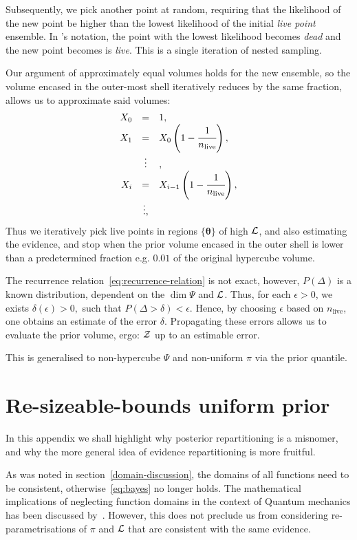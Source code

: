 \documentclass[usenatbib]{mnras}
\begin{document}
Subsequently, we pick another point at random, requiring that the
likelihood of the new point be higher than the lowest likelihood of
the initial \emph{live point} ensemble. In \citeauthor{Skilling2006}'s
notation, the point with the lowest likelihood becomes \emph{dead} and
the new point becomes is \emph{live}. This is a single iteration of
nested sampling.

Our argument of approximately equal volumes holds for the new
ensemble, so the volume encased in the outer-most shell iteratively
reduces by the same fraction, allows us to approximate said volumes:
\begin{equation}\label{eq:recurrence-relation}
  \begin{array}{rcl}
  X_{0} &=  &1, \\
  X_{1} &= &X_{0} \left(1- \cfrac{1}{n_\text{live}}\right),\\
  & \vdots &, \\
  X_{i} &= &X_{i-1}\left(1- \cfrac{1}{n_\text{live}}\right),\\
  & \vdots, &
\end{array}
\end{equation}
Thus we iteratively pick live points in regions $\{\bm{\theta}\}$ of
high \({\cal L}\), and also estimating the evidence, and stop when the
prior volume encased in the outer shell is lower than a predetermined
fraction e.g. \(0.01\) of the original hypercube volume.

The recurrence relation~\eqref{eq:recurrence-relation} is not exact,
however, \(P(\Delta)\) is a known distribution, dependent on the
\(\dim \Psi\) and \({\cal L}\). Thus, for each \(\epsilon>0\), we
exists
\(\delta(\epsilon) >0,\) such that \(P(\Delta > \delta)<\epsilon.\)
Hence, by choosing \(\epsilon\) based on \(n_\text{live}\), one
obtains an estimate of the error \(\delta\). Propagating these errors
allows us to evaluate the prior volume, ergo: ${\cal Z}$ up to an
estimable error.

This is generalised to non-hypercube $\Psi$ and non-uniform $\pi$ via
the prior quantile.

\section{Re-sizeable-bounds uniform prior}\label{sec:resizeable}
In this appendix we shall highlight why posterior repartitioning is a
misnomer, and why the more general idea of evidence repartitioning is
more fruitful.

As was noted in section~\vref{domain-discussion}, the domains of all
functions need to be consistent, otherwise~\vref{eq:bayes} no longer
holds. The mathematical implications of neglecting function domains in
the context of Quantum mechanics has been discussed
by~\cite{Gieres_2000}. However, this does not preclude us from
considering re-parametrisations of $\pi$ and ${\cal L}$ that are
consistent with the same evidence. 
\end{document}
